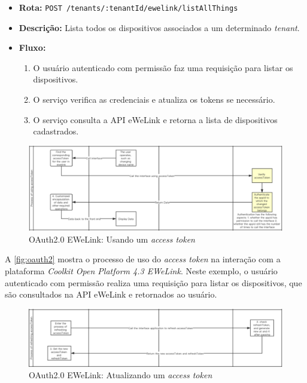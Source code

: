 \begin{itemize}
    \item \textbf{Rota:} \texttt{POST /tenants/:tenantId/ewelink/listAllThings}
    \item \textbf{Descrição:} Lista todos os dispositivos associados a um determinado \textit{tenant}.
    \item \textbf{Fluxo:}
    \begin{enumerate}
        \item O usuário autenticado com permissão faz uma requisição para listar os dispositivos.
        \item O serviço verifica as credenciais e atualiza os tokens se necessário.
        \item O serviço consulta a API eWeLink e retorna a lista de dispositivos cadastrados.
    \end{enumerate}
\end{itemize}

\begin{figure}[htp]
	\caption{\label{fig:oauth2}OAuth2.0 EWeLink: Usando um \textit{access token}}
	\begin{center}
	  \includegraphics[scale=0.45]{images/cap5/oauth_2.png}
	\end{center}
\end{figure}

A \autoref{fig:oauth2} mostra o processo de uso do \textit{access token} na interação com a plataforma \textit{Coolkit Open Platform 4.3 EWeLink}. Neste exemplo, o usuário autenticado com permissão realiza uma requisição para listar os dispositivos, que são consultados na API eWeLink e retornados ao usuário.

\begin{figure}[htp]
	\caption{\label{fig:oauth3}OAuth2.0 EWeLink: Atualizando um \textit{access token}}
	\begin{center}
	  \includegraphics[scale=0.45]{images/cap5/oauth_3.png}
	\end{center}
\end{figure}

